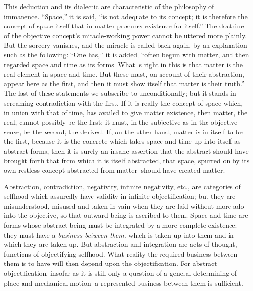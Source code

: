 \documentclass[12pt,a4paper]{book}
\begin{document}
This deduction and its dialectic are characteristic of
the philosophy of immanence. ``Space,'' it is said, ``is not adequate to its
concept; it is therefore the concept of space itself that in matter procures
existence for itself.'' The doctrine of the objective concept's miracle-working
power cannot be uttered more plainly. But the sorcery vanishes, and the miracle is
called back again, by an explanation such as the following: ``One has,'' it is
added, ``often begun with matter, and then regarded space and time as its forms.
What is right in this is that matter is the real element in space and time. But
these must, on account of their abstraction, appear here as the first, and then it
must show itself that matter is their truth.'' The last of these statements we
subscribe to unconditionally; but it stands in screaming contradiction with the
first. If it is really the concept of space which, in union with that of time, has
availed to give matter existence, then matter, the real, cannot possibly be the
first; it must, in the subjective as in the objective sense, be the second, the
derived. If, on the other hand, matter is in itself to be the first, because it is
the concrete which takes space and time up into itself as abstract forms, then it
is surely an insane assertion that the abstract should have brought forth that from
which it is itself abstracted, that space, spurred on by its own restless concept
abstracted from matter, should have created matter.

Abstraction, contradiction, negativity, infinite negativity, etc., are categories
of selfhood which assuredly have validity in infinite objectification; but they are
misunderstood, misused and taken in vain when they are laid without more ado into
the objective, so that outward being is ascribed to them. Space and time are forms
whose abstract being must be integrated by a more complete existence: they must
have a \emph{business between them}, which is taken up into them and in which they
are taken up. But abstraction and integration are acts of thought, functions of
objectifying selfhood. What reality the
required business between them is to have will then depend upon the
objectification. For abstract objectification, insofar as it is still only a
question of a general determining of place and mechanical motion, a represented
business between them is sufficient.
\end{document}
